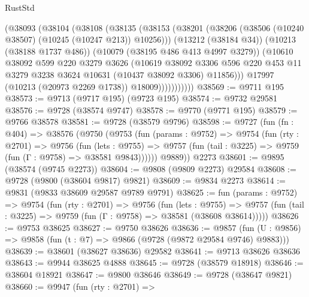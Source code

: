 \begin{lexlean}{RustStd}
\begin{coremodule}
{\begin{coremodule}
{{{{{{{{{{{{{{{{{{{{{{{{{{                  (@38093
                    (@38104
                      (@38108
                        (@38135
                          (@38153
                            (@38201 (@38206 (@38506 (@10240 @38507) (@10245 (@10247 @213)) @10256)))
                            (@13212 (@38184 @34))
                            (@10213 (@38188 @1737 @486))
                            (@10079 (@38195 @486 @413 @4997 @3279))
                            (@10610
                              @38092
                              @599
                              @220
                              @3279
                              @3626
                              (@10619
                                @38092
                                @3306
                                @596
                                @220
                                @453
                                @11
                                @3279
                                @3238
                                @3624
                                @10631
                                (@10437 @38092 @3306)
                                @11856)))
                          @17997
                          (@10213 (@20973 @2269 @1738))
                          @18009)))))))))))
@38569 := @9711 @195
@38573 := @9713 (@9717 @195) (@9723 @195)
@38574 := @9732 @29581
@38576 := @9728 (@38574 @9747)
@38578 := @9770 (@9771 @195)
@38579 := @9766 @38578
@38581 := @9728 (@38579 @9796)
@38598 := @9727
    (fun (fn : @404) =>
    @38576
      (@9750
        (@9753
          (fun (params : @9752) =>
          @9754
            (fun (rty : @2701) =>
            @9756
              (fun (lets : @9755) =>
              @9757 (fun (tail : @3225) => @9759 (fun (Γ : @9758) => @38581 @9843))))))
        @9889))
    @2273
@38601 := @9895 (@38574 (@9745 @2273))
@38604 := @9808 (@9809 @2273) @29584
@38608 := @9728 (@9800 (@38604 @9817) @9821)
@38609 := @9834 @2273
@38614 := @9831 (@9833 @38609 @29587 @9789 @9791)
@38625 := fun (params : @9752) =>
  @9754
    (fun (rty : @2701) =>
    @9756
      (fun (lets : @9755) =>
      @9757 (fun (tail : @3225) => @9759 (fun (Γ : @9758) => @38581 (@38608 @38614)))))
@38626 := @9753 @38625
@38627 := @9750 @38626
@38636 := @9857
    (fun (U : @9856) => @9858 (fun (t : @7) => @9866 (@9728 (@9872 @29584 @9746) @9883)))
@38639 := @38601 (@38627 @38636) @29582
@38641 := @9713 @38626 @38636
@38643 := @9944 @38625 @4888
@38645 := @9728 (@38579 @18918)
@38646 := @38604 @18921
@38647 := @9800 @38646
@38649 := @9728 (@38647 @9821)
@38660 := @9947
    (fun (rty : @2701) =>
}}}}}}}}}}}}}}}}}}}}}}}}}}
\end{coremodule}}
\end{coremodule}
\end{lexlean}
